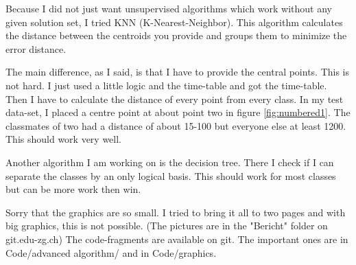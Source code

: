 \documentclass[paper=a4, fontsize=11pt]{article}
\begin{document}
Because I did not just want unsupervised algorithms which work without any given solution set, I tried KNN (K-Nearest-Neighbor). This algorithm calculates the distance between the centroids you provide and groups them to minimize the error distance.

The main difference, as I said, is that I have to provide the central points. This is not hard. I just used a little logic and the time-table and got the time-table.
Then I have to calculate the distance of every point from every class. In my test data-set, I placed a centre point at about point two in figure \ref{fig:numbered1}. The classmates of two had a distance of about 15-100 but everyone else at least 1200. This should work very well. 

Another algorithm I am working on is the decision tree. There I check if I can separate the classes by an only logical basis. This should work for most classes but can be more work then win.


Sorry that the graphics are so small. I tried to bring it all to two pages and with big graphics, this is not possible. (The pictures are in the "Bericht" folder on git.edu-zg.ch) The code-fragments are available on git. The important ones are in Code/advanced algorithm/ and in Code/graphics.
\end{document}
